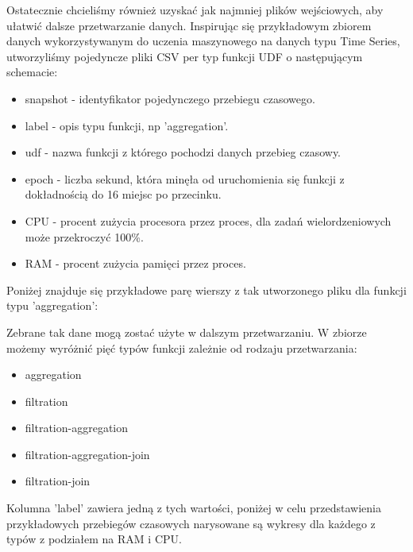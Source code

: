 Ostatecznie chcieliśmy również uzyskać jak najmniej plików wejściowych, aby ułatwić dalsze przetwarzanie danych. Inspirując się przykładowym zbiorem danych wykorzystywanym do uczenia maszynowego na danych typu Time Series, utworzyliśmy pojedyncze pliki CSV per typ funkcji UDF o następującym schemacie:
\begin{itemize}
    \item snapshot - identyfikator pojedynczego przebiegu czasowego.
    \item label - opis typu funkcji, np 'aggregation'.
    \item udf - nazwa funkcji z którego pochodzi danych przebieg czasowy.
    \item epoch - liczba sekund, która minęła od uruchomienia się funkcji z dokładnością do 16 miejsc po przecinku.
    \item CPU - procent zużycia procesora przez proces, dla zadań wielordzeniowych może przekroczyć 100\%.
    \item RAM - procent zużycia pamięci przez proces.
\end{itemize}
Poniżej znajduje się przykładowe parę wierszy z tak utworzonego pliku dla funkcji typu 'aggregation':
\begin{table}[H]
\caption{Początek pliku joined\_aggregation.csv}
\end{table}

Zebrane tak dane mogą zostać użyte w dalszym przetwarzaniu. W zbiorze możemy wyróżnić pięć typów funkcji zależnie od rodzaju przetwarzania:
\begin{itemize}
    \item aggregation
    \item filtration
    \item filtration-aggregation
    \item filtration-aggregation-join
    \item filtration-join
\end{itemize}
Kolumna 'label' zawiera jedną z tych wartości, poniżej w celu przedstawienia przykładowych przebiegów czasowych narysowane są wykresy dla każdego z typów z podziałem na RAM i CPU.

